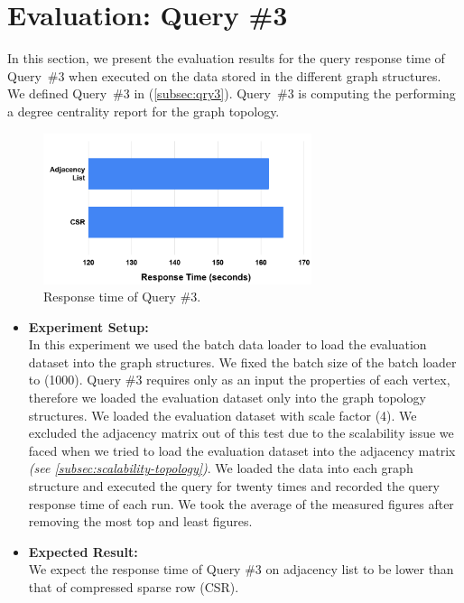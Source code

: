 {\begin{itemize}
\end{itemize}

\section{Evaluation: Query \#3}
\label{sec:eval-qry3}

In this section, we present the evaluation results for the query response time of \mbox{Query \#3} when executed on the data stored in the different graph structures. We defined \mbox{Query \#3} in (\ref{subsec:qry3}). \mbox{Query \#3} is computing the performing a degree centrality report for the graph topology.
\begin{figure}[H]
\centering
\includegraphics[width=0.7\textwidth]{pics/Query3-Eval.png}
\caption{Response time of Query \#3.}
\label{fig:eval-query3}
\end{figure} 

\begin{itemize}
\item \textbf{Experiment Setup:}\\
In this experiment we used the batch data loader to load the evaluation dataset into the graph structures. We fixed the batch size of the batch loader to (1000). Query \#3 requires only as an input the properties of each vertex, therefore we loaded the evaluation dataset only into the graph topology structures. We loaded the evaluation dataset with scale factor (4). We excluded the adjacency matrix out of this test due to the scalability issue we faced when we tried to load the evaluation dataset into the adjacency matrix \textit{(see \ref{subsec:scalability-topology})}. We loaded the data into each graph structure and executed the query for twenty times and recorded the query response time of each run. We took the average of the measured figures after removing the most top and least figures.

\item \textbf{Expected Result:}\\
We expect the response time of Query \#3 on adjacency list to be lower than that of compressed sparse row (CSR).


\end{itemize}}
